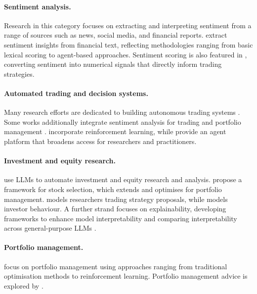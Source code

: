 \documentclass[12pt, a4paper]{report}
\begin{document}
\paragraph{Sentiment analysis.}
Research in this category focuses on extracting and interpreting sentiment from a range of
sources such as news, social media, and financial reports.
\cite{deng2022reddit,xing2024,kirtac2024}
extract sentiment insights from financial text, reflecting methodologies ranging from basic
lexical scoring to agent-based approaches.
Sentiment scoring is also featured in \cite{bond2023,lefort2024}, converting sentiment into
numerical signals that directly inform trading strategies.

\paragraph{Automated trading and decision systems.}
Many research efforts are dedicated to building autonomous trading systems
\cite{yu2024fincon,li2023tradinggpt,yu2023finmem,li2024cryptotrade}.
Some works additionally integrate sentiment analysis for trading and portfolio management
\cite{konstantinidis2024}.
\cite{saqur2024} incorporate reinforcement learning, while \cite{yang2024finrobot} provide
an agent platform that broadens access for researchers and practitioners.

\paragraph{Investment and equity research.}
\cite{papasotiriou2024,li2023multimodal,zhou2024finrobot} use LLMs to
automate investment and equity research and analysis.
\cite{fatouros2024} propose a framework for stock selection, which \cite{fatouros2025}
extends and optimises for portfolio management.
\cite{wang2023alphagpt} models researchers trading strategy proposals, while \cite{wang2024b} models investor
behaviour.
A further strand focuses on explainability, developing frameworks to enhance model
interpretability \cite{koa2024explainable,lopezlira2023,tong2024,zhao2024portfolio} and
comparing interpretability across general-purpose LLMs \cite{abdelsamie2024}.

\paragraph{Portfolio management.}
\cite{ko2024,huang2024portfolio,zhao2024portfolio} focus on
portfolio management using approaches ranging from traditional optimisation methods to
reinforcement learning.
Portfolio management advice is explored by \cite{fieberg2024,lu2025}.
\end{document}
